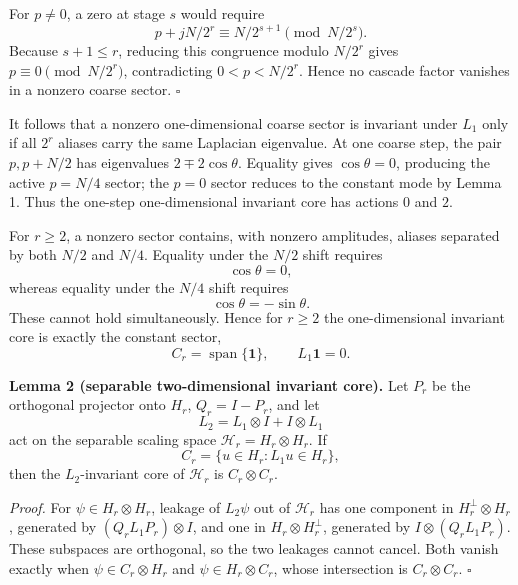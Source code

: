 \documentclass[11pt,a4paper]{article}
\begin{document}
For $p\ne0$, a zero at stage $s$ would require
\begin{equation}
p+jN/2^r\equiv N/2^{s+1}\pmod{N/2^s}.
\end{equation}
Because $s+1\le r$, reducing this congruence modulo $N/2^r$ gives $p\equiv0\pmod{N/2^r}$, contradicting $0<p<N/2^r$. Hence no cascade factor vanishes in a nonzero coarse sector. \hfill$\square$

It follows that a nonzero one-dimensional coarse sector is invariant under $L_1$ only if all $2^r$ aliases carry the same Laplacian eigenvalue. At one coarse step, the pair $p,p+N/2$ has eigenvalues $2\mp2\cos\theta$. Equality gives $\cos\theta=0$, producing the active $p=N/4$ sector; the $p=0$ sector reduces to the constant mode by Lemma 1. Thus the one-step one-dimensional invariant core has actions $0$ and $2$.

For $r\ge2$, a nonzero sector contains, with nonzero amplitudes, aliases separated by both $N/2$ and $N/4$. Equality under the $N/2$ shift requires
\begin{equation}
\cos\theta=0,
\end{equation}
whereas equality under the $N/4$ shift requires
\begin{equation}
\cos\theta=-\sin\theta.
\end{equation}
These cannot hold simultaneously. Hence for $r\ge2$ the one-dimensional invariant core is exactly the constant sector,
\begin{equation}
C_r=\operatorname{span}\{\mathbf 1\},\qquad L_1\mathbf1=0.
\end{equation}

\textbf{Lemma 2 (separable two-dimensional invariant core).}
Let $P_r$ be the orthogonal projector onto $H_r$, $Q_r=I-P_r$, and let
\begin{equation}
L_2=L_1\otimes I+I\otimes L_1
\end{equation}
act on the separable scaling space $\mathcal H_r=H_r\otimes H_r$. If
\begin{equation}
C_r=\{u\in H_r:L_1u\in H_r\},
\end{equation}
then the $L_2$-invariant core of $\mathcal H_r$ is $C_r\otimes C_r$.

\textit{Proof.}
For $\psi\in H_r\otimes H_r$, leakage of $L_2\psi$ out of $\mathcal H_r$ has one component in $H_r^\perp\otimes H_r$, generated by $(Q_rL_1P_r)\otimes I$, and one in $H_r\otimes H_r^\perp$, generated by $I\otimes(Q_rL_1P_r)$. These subspaces are orthogonal, so the two leakages cannot cancel. Both vanish exactly when $\psi\in C_r\otimes H_r$ and $\psi\in H_r\otimes C_r$, whose intersection is $C_r\otimes C_r$. \hfill$\square$
\end{document}
